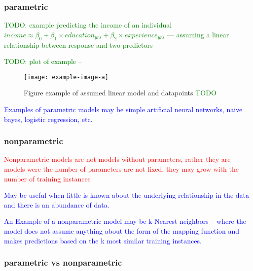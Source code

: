 \subsubsection{parametric}


\textcolor{green}{TODO: example \r{predicting the income of an individual $income \approx \beta_0 + \beta_1 \times education_{yrs} + \beta_2 \times experience_{yrs}$ --- assuming a linear relationship between response and two predictors}}

\textcolor{green}{TODO: plot of example -- }

\begin{figure}[htp]
	\centering
	\texttt{[image: example-image-a]}\hfil
	\caption{Figure example of assumed linear model and datapoints \textcolor{green}{TODO}}
	\label{fig:basics_para_assume_linear}
\end{figure}



\textcolor{blue}{Examples of parametric models may be simple artificial neural networks, naive bayes, logistic regression, etc.}

\subsubsection{nonparametric}

\textcolor{red}{Nonparametric models are not models without parameters, rather they are models were the number of parameters are not fixed, they may grow with the number of training instances}

\textcolor{blue}{May be useful when little is known about the underlying relationship in the data and there is an abundance of data.}

\textcolor{blue}{An Example of a nonparametric model may be k-Nearest neighbors -- where the model does not assume anything about the form of the mapping function and makes predictions based on the k most similar training instances.}

\subsubsection{parametric vs nonparametric}

